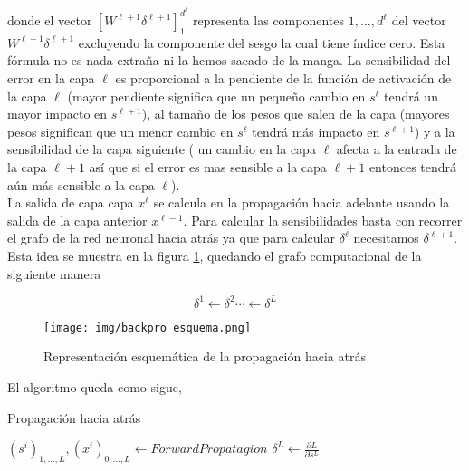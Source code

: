         \noindent donde el vector $[W^{\ell + 1} \delta^{\ell + 1}]_1^{d^{\ell}}$ representa las componentes $1,...,d^{\ell}$ del vector $W^{\ell + 1} \delta^{\ell + 1}$ excluyendo la componente del sesgo la cual tiene índice cero. Esta fórmula no es nada extraña ni la hemos sacado de la manga. La sensibilidad del error en la capa $\ell$ es proporcional a la pendiente de la función de activación de la capa $\ell$ (mayor pendiente significa que un pequeño cambio en $s^{\ell}$ tendrá un mayor impacto en $s^{\ell + 1}$), al tamaño de los pesos que salen de la capa (mayores pesos significan que un menor cambio en $s^{\ell}$ tendrá más impacto en $s^{\ell + 1}$) y a la sensibilidad de la capa siguiente ( un cambio en la capa $\ell$ afecta a la entrada de la capa $\ell + 1$ así que si el error es mas sensible a la capa $\ell + 1$ entonces tendrá aún más sensible a la capa $\ell$). \\
        
   
        La salida de capa capa $x^{\ell}$ se calcula en la propagación hacia adelante usando la salida de la capa anterior $x^{\ell - 1}$. Para calcular la sensibilidades basta con recorrer el grafo de la red neuronal hacia atrás ya que para calcular $\delta^{\ell}$ necesitamos $\delta^{\ell + 1}$. Esta idea se muestra en la figura \ref{fig:backpro esquema}, quedando el grafo computacional de la siguiente manera
        
        \begin{equation}
            \delta^{1} \leftarrow \delta^{2} \cdots \leftarrow \delta^L
        \end{equation}
   
        \begin{figure}[htpb]
            \centering
            \texttt{[image: img/backpro esquema.png]}
            \caption{Representación esquemática de la propagación hacia atrás}
            \label{fig:backpro esquema}
        \end{figure}
        
        El algoritmo queda como sigue,
        
        \begin{algorithm}[H]
	       \label{alg:feedforward}
	        \caption{Propagación hacia atrás}
	        
	        $(s^i)_{1,...,L},(x^i)_{0,...,L} \leftarrow ForwardPropatagion$ \;
	        $\delta^L \leftarrow \frac{\partial L}{\partial s^L}$ \; 
	   \end{algorithm}
        


